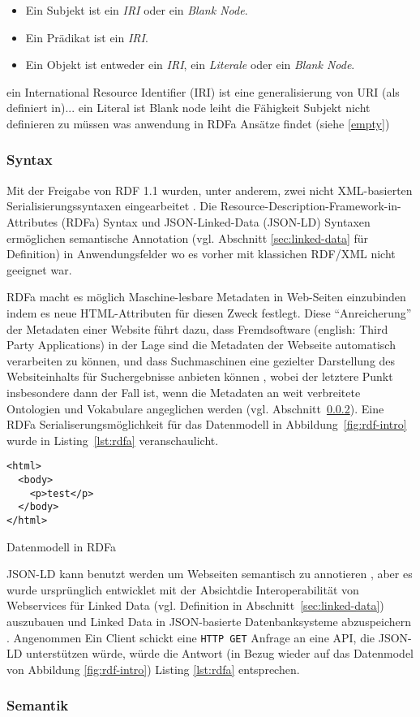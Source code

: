 \begin{itemize}
	\item Ein Subjekt ist ein \textit{IRI} oder ein \textit{Blank Node}.
	\item Ein Prädikat ist ein \textit{IRI}.
	\item Ein Objekt ist entweder ein \textit{IRI}, ein \textit{Literale} oder ein \textit{Blank Node}.
\end{itemize}
ein International Resource Identifier (IRI) ist eine generalisierung von URI (als definiert in)...
ein Literal ist
Blank node leiht die Fähigkeit Subjekt nicht definieren zu müssen was anwendung in RDFa Ansätze findet (siehe \ref{empty})

\subsubsection{Syntax}
\label{sec:syntax}
Mit der Freigabe von RDF 1.1 wurden, unter anderem, zwei nicht XML-basierten Serialisierungssyntaxen eingearbeitet \parencite[vgl.][Abs. 3]{Wood:14:WNR}. Die Resource-Description-Framework-in-Attributes (RDFa) Syntax und JSON-Linked-Data (JSON-LD) Syntaxen ermöglichen semantische Annotation (vgl. Abschnitt \ref{sec:linked-data} für Definition) in Anwendungsfelder wo es vorher mit klassichen RDF/XML nicht geeignet war. 

RDFa macht es möglich Maschine-lesbare Metadaten in Web-Seiten einzubinden indem es neue HTML-Attributen für diesen Zweck festlegt. Diese \hyphenquote{german}{Anreicherung} der Metadaten einer Website führt dazu, dass Fremdsoftware (english: Third Party Applications) in der Lage sind die Metadaten der Webseite automatisch verarbeiten zu können, und dass Suchmaschinen eine gezielter Darstellung des Websiteinhalts für Suchergebnisse anbieten können \parencite[vgl.][Abs. 2]{Schreiber:14:RP}, wobei der letztere Punkt insbesondere dann der Fall ist, wenn die Metadaten an weit verbreitete Ontologien und Vokabulare angeglichen werden (vgl. Abschnitt~\ref{sec:semantik}). Eine RDFa Serialiserungsmöglichkeit für das Datenmodell in Abbildung~\ref{fig:rdf-intro} wurde in Listing~\ref{lst:rdfa} veranschaulicht.
\begin{listing}[H]
\begin{verbatim}
<html>
  <body>
    <p>test</p>
  </body>
</html>
\end{verbatim}
\caption{Datenmodell in RDFa}
\label{lst:rdfa}
\end{listing}
JSON-LD kann benutzt werden um Webseiten semantisch zu annotieren \parencite[vgl.]{Vincent2015}, aber es wurde ursprünglich entwicklet mit der Absichtdie Interoperabilität von Webservices für Linked Data (vgl. Definition in Abschnitt~\ref{sec:linked-data}) auszubauen und Linked Data in JSON-basierte Datenbanksysteme abzuspeichern \parencite[vgl.][Abs.~1]{Lanthaler:14:J}. Angenommen Ein Client schickt eine \texttt{HTTP GET} Anfrage an eine API, die JSON-LD unterstützen würde, würde die Antwort (in Bezug wieder auf das Datenmodel von Abbildung \ref{fig:rdf-intro}) Listing \ref{lst:rdfa} entsprechen.
\subsubsection{Semantik}
\label{sec:semantik}
